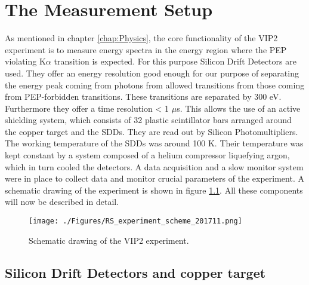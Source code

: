 \chapter{The Measurement Setup}
\label{chap:Setup}


As mentioned in chapter \ref{chap:Physics}, the core functionality of the VIP2 experiment is to measure energy spectra in the energy region where the PEP violating K$\alpha$ transition is expected. For this purpose Silicon Drift Detectors are used. They offer an energy resolution good enough for our purpose of separating the energy peak coming from photons from allowed transitions from those coming from PEP-forbidden transitions. These transitions are separated by 300 eV. Furthermore they offer a time resolution < 1 $\mu$s. This allows the use of an active shielding system, which consists of 32 plastic scintillator bars arranged around the copper target and the SDDs. They are read out by Silicon Photomultipliers. The working temperature of the SDDs was around 100 K. Their temperature was kept constant by a system composed of a helium compressor liquefying argon, which in turn cooled the detectors. A data acquisition and a slow monitor system were in place to collect data and monitor crucial parameters of the experiment. A schematic drawing of the experiment is shown in figure \ref{fig:expScheme}. All these components will now be described in detail.
\begin{figure}[h]
 \centering
 \texttt{[image: ./Figures/RS\_experiment\_scheme\_201711.png]}
 \caption{Schematic drawing of the VIP2 experiment.}
 \label{fig:expScheme}
\end{figure}


\section{Silicon Drift Detectors and copper target}
\label{sec:SDDs}


